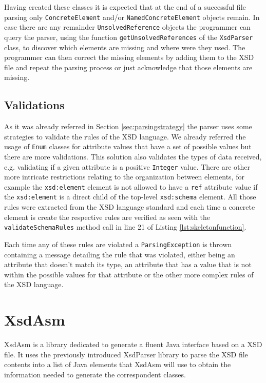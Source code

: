 \noindent
Having created these classes it is expected that at the end of a successful file parsing only \texttt{ConcreteElement} and/or \texttt{NamedConcreteElement} objects remain. In case there are any remainder \texttt{UnsolvedReference} objects the programmer can query the parser, using the function \texttt{getUnsolvedReferences} of the \texttt{XsdParser} class, to discover which elements are missing and where were they used. The programmer can then correct the missing elements by adding them to the \ac{XSD} file and repeat the parsing process or just acknowledge that those elements are missing. 

\subsection{Validations}

As it was already referred in Section \ref{sec:parsingstrategy} the parser uses some strategies to validate the rules of the \ac{XSD} language. We already referred the usage of \texttt{Enum} classes for attribute values that have a set of possible values but there are more validations. This solution also validates the types of data received, e.g. validating if a given attribute is a positive \texttt{Integer} value. There are other more intricate restrictions relating to the organization between elements, for example the \texttt{xsd:element} element is not allowed to have a \texttt{ref} attribute value if the \texttt{xsd:element} is a direct child of the top-level \texttt{xsd:schema} element. All those rules were extracted from the \ac{XSD} language standard and each time a concrete element is create the respective rules are verified as seen with the \texttt{validateSchemaRules} method call in line 21 of Listing \ref{lst:skeletonfunction}. 

\noindent
Each time any of these rules are violated a \texttt{ParsingException} is thrown containing a message detailing the rule that was violated, either being an attribute that doesn't match its type, an attribute that has a value that is not within the possible values for that attribute or the other more complex rules of the \ac{XSD} language.

\section{XsdAsm} %
\label{sec:xsdasm}

XsdAsm is a library dedicated to generate a fluent Java interface based on a \ac{XSD} file. It uses the previously introduced XsdParser library to parse the \ac{XSD} file contents into a list of Java elements that XsdAsm will use to obtain the information needed to generate the correspondent classes. 

